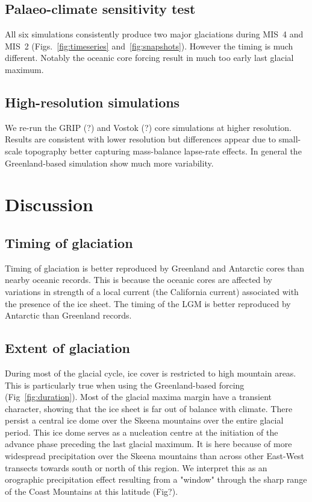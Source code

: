 \documentclass[tc, ms]{copernicus}
\begin{document}
\subsection{Palaeo-climate sensitivity test}

All six simulations consistently produce two major glaciations during MIS~4 and
MIS~2 (Figs.~\ref{fig:timeseries} and~\ref{fig:snapshots}).
However the timing is much different. Notably the oceanic core forcing result
in much too early last glacial maximum.

\subsection{High-resolution simulations}

We re-run the GRIP (?) and Vostok (?) core simulations at higher resolution.
Results are
consistent with lower resolution but differences appear due to small-scale
topography better capturing mass-balance lapse-rate effects. In general the
Greenland-based simulation show much more variability.

\section{Discussion}
\label{sec:discussion}

\subsection{Timing of glaciation}

Timing of glaciation is better reproduced by Greenland and Antarctic cores than
nearby oceanic records. This is because the oceanic cores are affected by
variations in strength of a local current (the California current) associated
with the presence of the ice sheet. The timing of the LGM is better reproduced
by Antarctic than Greenland records.

\subsection{Extent of glaciation}

During most of the glacial cycle, ice cover is restricted to high mountain
areas. This is particularly true when using the Greenland-based forcing
(Fig~\ref{fig:duration}). Most of the glacial maxima margin have a transient
character, showing that the ice sheet is far out of balance with climate. There
persist a central ice dome over the Skeena mountains over the entire glacial
period. This ice dome serves as a nucleation centre at the initiation of the
advance phase preceding the last glacial maximum. It is here because of more
widespread precipitation over the Skeena mountains than across other East-West
transects towards south or north of this region. We interpret this as an
orographic precipitation effect resulting from a "window" through the sharp
range of the Coast Mountains at this latitude (Fig?).
\end{document}
